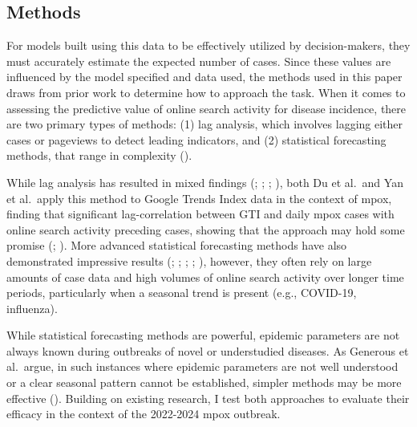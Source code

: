 \documentclass[
  12pt,
]{article}
\begin{document}
\subsection{Methods}\label{methods}

For models built using this data to be effectively utilized by
decision-makers, they must accurately estimate the expected number of
cases. Since these values are influenced by the model specified and data
used, the methods used in this paper draws from prior work to determine
how to approach the task. When it comes to assessing the predictive
value of online search activity for disease incidence, there are two
primary types of methods: (1) lag analysis, which involves lagging
either cases or pageviews to detect leading indicators, and (2)
statistical forecasting methods, that range in complexity
().

While lag analysis has resulted in mixed findings
(;
;
;
), both Du et al.~and Yan et
al.~apply this method to Google Trends Index data in the context of
mpox, finding that significant lag-correlation between GTI and daily
mpox cases with online search activity preceding cases, showing that the
approach may hold some promise (;
). More advanced statistical
forecasting methods have also demonstrated impressive results
(;
;
;
;
), however, they
often rely on large amounts of case data and high volumes of online
search activity over longer time periods, particularly when a seasonal
trend is present (e.g., COVID-19, influenza).

While statistical forecasting methods are powerful, epidemic parameters
are not always known during outbreaks of novel or understudied diseases.
As Generous et al.~argue, in such instances where epidemic parameters
are not well understood or a clear seasonal pattern cannot be
established, simpler methods may be more effective
(). Building on
existing research, I test both approaches to evaluate their efficacy in
the context of the 2022-2024 mpox outbreak.
\end{document}
